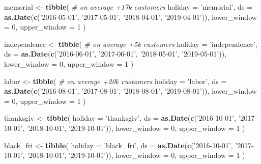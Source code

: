 \documentclass[]{article}
\newenvironment{Shaded}{\begin{snugshade}}{\end{snugshade}}
\newcommand{\KeywordTok}[1]{\textcolor[rgb]{0.13,0.29,0.53}{\textbf{{#1}}}}
\newcommand{\DataTypeTok}[1]{\textcolor[rgb]{0.13,0.29,0.53}{{#1}}}
\newcommand{\DecValTok}[1]{\textcolor[rgb]{0.00,0.00,0.81}{{#1}}}
\newcommand{\StringTok}[1]{\textcolor[rgb]{0.31,0.60,0.02}{{#1}}}
\newcommand{\CommentTok}[1]{\textcolor[rgb]{0.56,0.35,0.01}{\textit{{#1}}}}
\newcommand{\NormalTok}[1]{{#1}}
\begin{document}
\begin{Shaded}
\begin{Highlighting}[]
\NormalTok{memorial <-}\StringTok{ }\KeywordTok{tibble}\NormalTok{(}
  \CommentTok{# on average +17k customers}
  \DataTypeTok{holiday =} \StringTok{'memorial'}\NormalTok{,}
  \DataTypeTok{ds =} \KeywordTok{as.Date}\NormalTok{(}\KeywordTok{c}\NormalTok{(}\StringTok{'2016-05-01'}\NormalTok{, }\StringTok{'2017-05-01'}\NormalTok{, }\StringTok{'2018-04-01'}\NormalTok{,}
                 \StringTok{'2019-04-01'}\NormalTok{)),}
  \DataTypeTok{lower_window =} \DecValTok{0}\NormalTok{,}
  \DataTypeTok{upper_window =} \DecValTok{1}
\NormalTok{)}

\NormalTok{independence <-}\StringTok{ }\KeywordTok{tibble}\NormalTok{(}
  \CommentTok{# on average +5k customers}
  \DataTypeTok{holiday =} \StringTok{'independence'}\NormalTok{,}
  \DataTypeTok{ds =} \KeywordTok{as.Date}\NormalTok{(}\KeywordTok{c}\NormalTok{(}\StringTok{'2016-06-01'}\NormalTok{, }\StringTok{'2017-06-01'}\NormalTok{, }\StringTok{'2018-05-01'}\NormalTok{,}
                 \StringTok{'2019-05-01'}\NormalTok{)),}
  \DataTypeTok{lower_window =} \DecValTok{0}\NormalTok{,}
  \DataTypeTok{upper_window =} \DecValTok{1}
\NormalTok{)}

\NormalTok{labor <-}\StringTok{ }\KeywordTok{tibble}\NormalTok{(}
  \CommentTok{# on average +20k customers}
  \DataTypeTok{holiday =} \StringTok{'labor'}\NormalTok{,}
  \DataTypeTok{ds =} \KeywordTok{as.Date}\NormalTok{(}\KeywordTok{c}\NormalTok{(}\StringTok{'2016-08-01'}\NormalTok{, }\StringTok{'2017-08-01'}\NormalTok{, }\StringTok{'2018-08-01'}\NormalTok{,}
                 \StringTok{'2019-08-01'}\NormalTok{)),}
  \DataTypeTok{lower_window =} \DecValTok{0}\NormalTok{,}
  \DataTypeTok{upper_window =} \DecValTok{1}
\NormalTok{)}

\NormalTok{thanksgiv <-}\StringTok{ }\KeywordTok{tibble}\NormalTok{(}
  \DataTypeTok{holiday =} \StringTok{'thanksgiv'}\NormalTok{,}
  \DataTypeTok{ds =} \KeywordTok{as.Date}\NormalTok{(}\KeywordTok{c}\NormalTok{(}\StringTok{'2016-10-01'}\NormalTok{, }\StringTok{'2017-10-01'}\NormalTok{, }\StringTok{'2018-10-01'}\NormalTok{,}
                 \StringTok{'2019-10-01'}\NormalTok{)),}
  \DataTypeTok{lower_window =} \DecValTok{0}\NormalTok{,}
  \DataTypeTok{upper_window =} \DecValTok{1}
\NormalTok{)}

\NormalTok{black_fri <-}\StringTok{ }\KeywordTok{tibble}\NormalTok{(}
  \DataTypeTok{holiday =} \StringTok{'black_fri'}\NormalTok{,}
  \DataTypeTok{ds =} \KeywordTok{as.Date}\NormalTok{(}\KeywordTok{c}\NormalTok{(}\StringTok{'2016-10-01'}\NormalTok{, }\StringTok{'2017-10-01'}\NormalTok{, }\StringTok{'2018-10-01'}\NormalTok{,}
                 \StringTok{'2019-10-01'}\NormalTok{)),}
  \DataTypeTok{lower_window =} \DecValTok{0}\NormalTok{,}
  \DataTypeTok{upper_window =} \DecValTok{1}
\NormalTok{)}


\end{Highlighting}
\end{Shaded}
\end{document}
